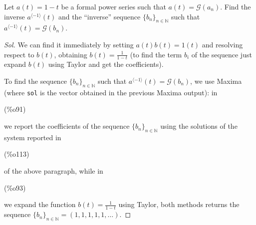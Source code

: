 \begin{exercise}
  Let $a(t) = 1-t$ be a formal power series such that $a(t) =
  \mathcal{G} (a_n)$. Find the inverse $a^{\langle -1\rangle}(t)$ and
  the ``inverse'' sequence $\{b_n\}_{n\in\mathbb{N} } $ such that
  $a^{\langle -1\rangle}(t) = \mathcal{G}(b_n) $.
\end{exercise}
\begin{proof}[Sol]
  We can find it immediately by setting $a(t)b(t)=1(t)$ and resolving
  respect to $b(t)$, obtaining $b(t) = \frac{1}{1-t} $ (to find the
  term $b_i$ of the sequence just expand $b(t)$ using Taylor and get
  the coefficients).

  To find the sequence $\{b_n\}_{n\in\mathbb{N} } $ such that
  $a^{\langle -1\rangle}(t) = \mathcal{G}(b_n) $, we use Maxima (where
  \texttt{\color{blue}sol} is the vector obtained in the previous
  Maxima output): in \parbox{8ex}{\color{labelcolor}(\%o91) } we
  report the coefficients of the sequence $\{b_n\}_{n\in\mathbb{N} } $
  using the solutions of the system reported
  in \parbox{8ex}{\color{labelcolor}(\%o113) } of the above paragraph,
  while in \parbox{8ex}{\color{labelcolor}(\%o93) } we expand the
  function $b(t) = \frac{1}{1-t} $ using Taylor, both methods returns
  the sequence $\{b_n\}_{n\in\mathbb{N} } = (1,1,1,1,1,\ldots)$.


\end{proof}

